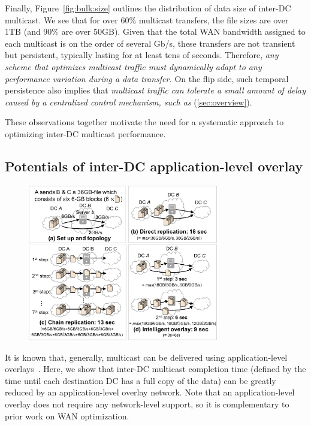 Finally, Figure~\ref{fig:bulk:size} outlines the distribution of data
size of inter-DC multicast. We see that for over 60\% multicast
transfers, the file sizes are over 1TB (and 90\% are over 50GB).
Given that the total WAN bandwidth assigned to each multicast is on
the order of several Gb/s, these transfers are not transient but
persistent, typically lasting for at least tens of seconds.
Therefore, {\em any scheme that optimizes multicast traffic must
dynamically adapt to any performance variation during a data transfer.}
On the flip side, such temporal persistence also implies that {\em
multicast traffic can tolerate a small amount of delay caused by
a centralized control mechanism, such as \name}
(\Section\ref{sec:overview}).


\vspace{0.1cm}
These observations together motivate the need for a systematic approach
to optimizing inter-DC multicast performance.

\subsection{Potentials of inter-DC application-level overlay}
\label{subsec:motivation:case-for}

\begin{figure}[t]
\centering
\includegraphics[width=84mm]{images/example-2.pdf}
\label{fig:case:example}
\end{figure}

It is known that, generally, multicast can be delivered using application-level
overlays~\cite{chu2000case}. Here, we show that inter-DC multicast
completion time (defined by the time until each destination DC has
a full copy of the data) can be greatly reduced by an
application-level overlay network. Note that an application-level
overlay does not require any network-level support, so it is
complementary to prior work on WAN optimization.

